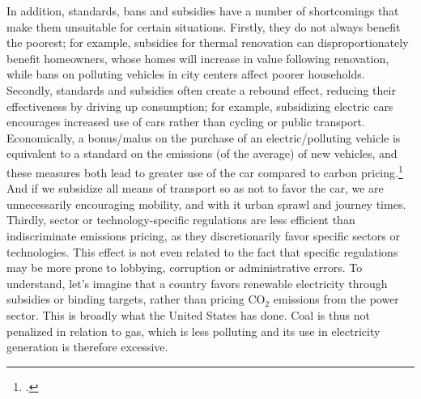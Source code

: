 \documentclass[a5paper,english,openany]{memoir}
\begin{document}
In addition, standards, bans and subsidies have a number of shortcomings that make them unsuitable for certain situations. Firstly, they do not %
always benefit the poorest; %
for example, subsidies for thermal renovation can disproportionately benefit homeowners, whose homes will increase in value following renovation,  %
while bans on polluting vehicles in city centers %
affect poorer households. Secondly, standards and subsidies often create a rebound effect, reducing their effectiveness by driving up consumption; for %
example, subsidizing %
electric cars encourages increased use of cars %
rather than cycling or public transport. 
Economically, a bonus/malus on the purchase of an electric/polluting vehicle is equivalent to a standard on the emissions (of the average) of new vehicles, and these measures both lead to greater use of the car compared to carbon pricing.\footnote{\citet{fullerton_suggested_2003}.} And if we subsidize %
all means of transport so as not to favor %
the car, we are unnecessarily encouraging mobility, and with it urban sprawl and journey times. %
Thirdly, sector %
or technology-specific regulations are less efficient than indiscriminate emissions pricing, as they discretionarily favor %
specific sectors or technologies. This effect is not even related to the fact that specific regulations may be more prone to lobbying, corruption or administrative errors. 
To understand, let's imagine that a country favors %
renewable electricity through subsidies or binding targets, rather than pricing CO$_\text{2}$ emissions from the power sector. This is broadly what the United States has done. Coal is thus not penalized %
in relation to gas, which is less polluting %
and its use in electricity generation is therefore excessive. %
\end{document}
